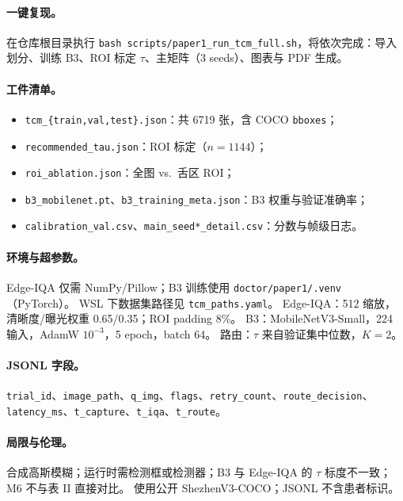 \paragraph{一键复现。}
在仓库根目录执行 \texttt{bash scripts/paper1\_run\_tcm\_full.sh}，将依次完成：导入划分、训练 B3、ROI 标定 $\tau$、主矩阵（3 seeds）、图表与 PDF 生成。

\paragraph{工件清单。}
\begin{itemize}
  \item \texttt{tcm\_\{train,val,test\}.json}：共 6719 张，含 COCO \texttt{bboxes}；
  \item \texttt{recommended\_tau.json}：ROI 标定（$n{=}1144$）；
  \item \texttt{roi\_ablation.json}：全图 vs.\ 舌区 ROI；
  \item \texttt{b3\_mobilenet.pt}、\texttt{b3\_training\_meta.json}：B3 权重与验证准确率；
  \item \texttt{calibration\_val.csv}、\texttt{main\_seed*\_detail.csv}：分数与帧级日志。
\end{itemize}

\paragraph{环境与超参数。}
Edge-IQA 仅需 NumPy/Pillow；B3 训练使用 \texttt{doctor/paper1/.venv}（PyTorch）。
WSL 下数据集路径见 \texttt{tcm\_paths.yaml}。
Edge-IQA：512 缩放，清晰度/曝光权重 0.65/0.35；ROI padding 8\%。
B3：MobileNetV3-Small，224 输入，AdamW $10^{-3}$，5 epoch，batch 64。
路由：$\tau$ 来自验证集中位数，$K{=}2$。

\paragraph{JSONL 字段。}
\texttt{trial\_id}、\texttt{image\_path}、\texttt{q\_img}、\texttt{flags}、\texttt{retry\_count}、\texttt{route\_decision}、\texttt{latency\_ms}、\texttt{t\_capture}、\texttt{t\_iqa}、\texttt{t\_route}。

\paragraph{局限与伦理。}
合成高斯模糊；运行时需检测框或检测器；B3 与 Edge-IQA 的 $\tau$ 标度不一致；M6 不与表 II 直接对比。
使用公开 ShezhenV3-COCO；JSONL 不含患者标识。

